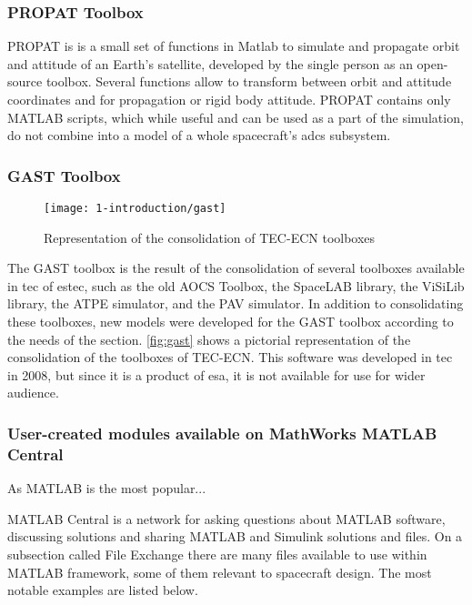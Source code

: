     \subsubsection{PROPAT Toolbox}
        PROPAT is is a small set of functions in Matlab to simulate and propagate orbit and attitude of an Earth's satellite, developed by the single person as an open-source toolbox. Several functions allow to transform between orbit and attitude coordinates and for propagation or rigid body attitude. PROPAT contains only MATLAB scripts, which while useful and can be used as a part of the simulation, do not combine into a model of a whole spacecraft's \ac{adcs} subsystem.

    \subsubsection{GAST Toolbox}
        \begin{figure}[H]
            \centering
            \texttt{[image: 1-introduction/gast]}
            \caption{Representation of the consolidation of TEC-ECN toolboxes}
            \label{fig:gast}
        \end{figure}

        The GAST toolbox is the result of the consolidation of several toolboxes available in \ac{tec} of \ac{estec}, such as the old AOCS Toolbox, the SpaceLAB library, the ViSiLib library, the ATPE simulator, and the PAV simulator. In addition to consolidating these toolboxes, new models were developed for the GAST toolbox according to the needs of the section. \autoref{fig:gast} shows a pictorial representation of the consolidation of the toolboxes of TEC-ECN. This software was developed in \ac{tec} in 2008, but since it is a product of \ac{esa}, it is not available for use for wider audience.

    \subsubsection{User-created modules available on MathWorks MATLAB Central}
    As MATLAB is the most popular... %
    
    MATLAB Central is a network for asking questions about MATLAB software, discussing solutions and sharing MATLAB and Simulink solutions and files. On a subsection called File Exchange there are many files available to use within MATLAB framework, some of them relevant to spacecraft design. The most notable examples are listed below.

